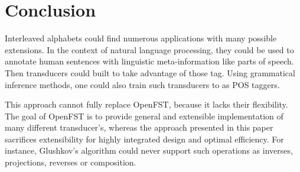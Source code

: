 


\section{Conclusion}

Interleaved alphabets could find numerous applications with many possible extensions. In the context of natural language processing, they could be used to annotate human sentences with linguistic meta-information like parts of speech. Then transducers could built to take advantage of those tag. Using grammatical inference methods, one could also train such transducers to as POS taggers.

This approach cannot fully replace OpenFST, because it lacks their flexibility. The goal of OpenFST is to provide general and extensible implementation of many different transducer's, whereas the approach presented in this paper sacrifices extensibility for highly integrated design and optimal efficiency. For instance, Glushkov's algorithm could never support such operations  as inverses, projections, reverses or composition. 

